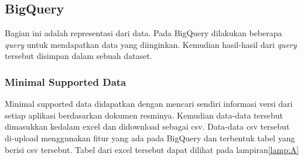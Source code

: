\subsection{BigQuery}
Bagian ini adalah representasi dari data. Pada BigQuery dilakukan beberapa \textit{query} untuk mendapatkan data yang diinginkan. Kemudian hasil-hasil dari \textit{query} tersebut disimpan dalam sebuah dataset.

\subsubsection{Minimal Supported Data}
Minimal supported data didapatkan dengan mencari sendiri informasi versi dari setiap aplikasi berdasarkan dokumen resminya. Kemudian data-data tersebut dimasukkan kedalam excel dan didownload sebagai csv. Data-data csv tersebut di-upload menggunakan fitur yang ada pada BigQuery dan terbentuk tabel yang berisi csv tersebut. Tabel dari excel tersebut dapat dilihat pada lampiran\ref{lamp:A}

